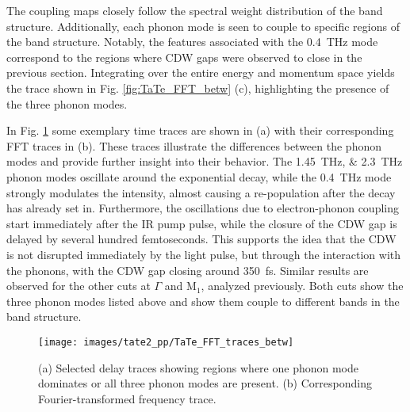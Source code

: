 The coupling maps closely follow the spectral weight distribution of the band structure.
Additionally, each phonon mode is seen to couple to specific regions of the band structure.
Notably, the features associated with the \qty{0.4}{\tera\hertz} mode correspond to the regions where CDW gaps were observed to close in the previous section.
Integrating over the entire energy and momentum space yields the trace shown in Fig. \ref{fig:TaTe_FFT_betw} (c), highlighting the presence of the three phonon modes.

In Fig. \ref{fig:TaTe_FFT_traces_betw} some exemplary time traces are shown in (a) with their corresponding FFT traces in (b).
These traces illustrate the differences between the phonon modes and provide further insight into their behavior.
The \qtylist{1.45; 2.3}{\tera\hertz} phonon modes oscillate around the exponential decay, while the \qty{0.4}{\tera\hertz} mode strongly modulates the intensity, almost causing a re-population after the decay has already set in.
Furthermore, the oscillations due to electron-phonon coupling start immediately after the IR pump pulse, while the closure of the CDW gap is delayed by several hundred femtoseconds.
This supports the idea that the CDW is not disrupted immediately by the light pulse, but through the interaction with the phonons, with the CDW gap closing around \qty{350}{\femto\second}.
Similar results are observed for the other cuts at $\Gamma$ and M$_1$, analyzed previously.
Both cuts show the three phonon modes listed above and show them couple to different bands in the band structure.

\begin{figure}[t!]
	\centering
	\texttt{[image: images/tate2\_pp/TaTe\_FFT\_traces\_betw]}
	\caption{(a) Selected delay traces showing regions where one phonon mode dominates or all three phonon modes are present. (b) Corresponding Fourier-transformed frequency trace.}
	\label{fig:TaTe_FFT_traces_betw}
\end{figure}


